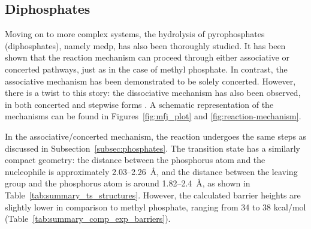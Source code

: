 \subsection{Diphosphates}
Moving on to more complex systems, the hydrolysis of pyrophosphates (diphosphates), namely \ac{medp}, has also been thoroughly studied. It has been shown that the reaction mechanism can proceed through either associative or concerted pathways, just as in the case of methyl phosphate. In contrast, the associative mechanism has been demonstrated to be solely concerted. However, there is a twist to this story: the dissociative mechanism has also been observed, in both concerted and stepwise forms \citep{klahnMechanismHydrolysisPhosphate2006, kamerlinAssociativeDissociativeMechanisms2008, prasadAddressingOpenQuestions2013}. A schematic representation of the mechanisms can be found in Figures~\ref{fig:mfj_plot} and \ref{fig:reaction-mechanism}.

In the associative/concerted mechanism, the reaction undergoes the same steps as discussed in Subsection~\ref{subsec:phosphates}. The transition state has a similarly compact geometry: the distance between the phosphorus atom and the nucleophile is approximately 2.03--2.26~\AA, and the distance between the leaving group and the phosphorus atom is around 1.82--2.4~\AA, as shown in Table~\ref{tab:summary_ts_structures}. However, the calculated barrier heights are slightly lower in comparison to methyl phosphate, ranging from 34 to 38 kcal/mol (Table~\ref{tab:summary_comp_exp_barriers}).

